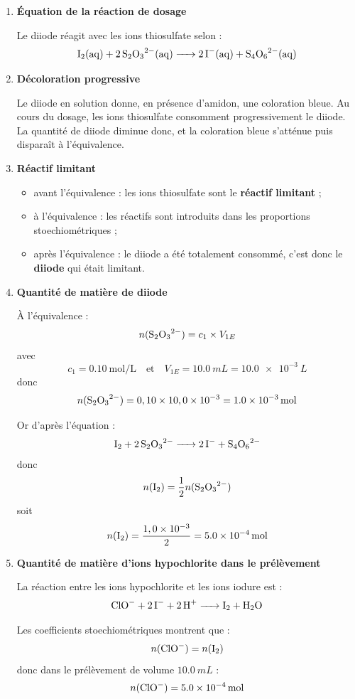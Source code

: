 \documentclass[a4paper,fontsize=11pt,fleqn]{scrartcl}
\begin{document}
\begin{enumerate}
    \item \textbf{Équation de la réaction de dosage}

    Le diiode réagit avec les ions thiosulfate selon :
    \[
    \ce{I2(aq) + 2S2O3^{2-}(aq) -> 2I^-(aq) + S4O6^{2-}(aq)}
    \]

    \item \textbf{Décoloration progressive}

    Le diiode en solution donne, en présence d'amidon, une coloration bleue.  
    Au cours du dosage, les ions thiosulfate consomment progressivement le diiode.  
    La quantité de diiode diminue donc, et la coloration bleue s'atténue puis disparaît à l'équivalence.

    \item \textbf{Réactif limitant}

    \begin{itemize}
        \item avant l'équivalence : les ions thiosulfate sont le \textbf{réactif limitant} ;
        \item à l'équivalence : les réactifs sont introduits dans les proportions stoechiométriques ;
        \item après l'équivalence : le diiode a été totalement consommé, c'est donc le \textbf{diiode} qui était limitant.
    \end{itemize}

    \item \textbf{Quantité de matière de diiode}

    À l'équivalence :
    \[
    n(\ce{S2O3^{2-}}) = c_1 \times V_{1E}
    \]
    avec
    \[
    c_1 = \SI{0,10}{\mole\per\liter}
    \quad \text{et} \quad
    V_{1E} = \SI{10,0}{mL} = \SI{10,0e-3}{L}
    \]
    donc
    \[
    n(\ce{S2O3^{2-}}) = 0,10 \times 10,0\times10^{-3} = \SI{1,0e-3}{mol}
    \]

    Or d'après l'équation :
    \[
    \ce{I2 + 2S2O3^{2-} -> 2I^- + S4O6^{2-}}
    \]
    donc
    \[
    n(\ce{I2}) = \frac{1}{2}n(\ce{S2O3^{2-}})
    \]
    soit
    \[
    n(\ce{I2}) = \frac{1,0\times10^{-3}}{2} = \SI{5,0e-4}{mol}
    \]

    \item \textbf{Quantité de matière d'ions hypochlorite dans le prélèvement}

    La réaction entre les ions hypochlorite et les ions iodure est :
    \[
    \ce{ClO^- + 2I^- + 2H^+ -> I2 + H2O}
    \]

    Les coefficients stoechiométriques montrent que :
    \[
    n(\ce{ClO^-}) = n(\ce{I2})
    \]
    donc dans le prélèvement de volume \(\SI{10,0}{mL}\) :
    \[
    n(\ce{ClO^-}) = \SI{5,0e-4}{mol}
    \]


\end{enumerate}
\end{document}

